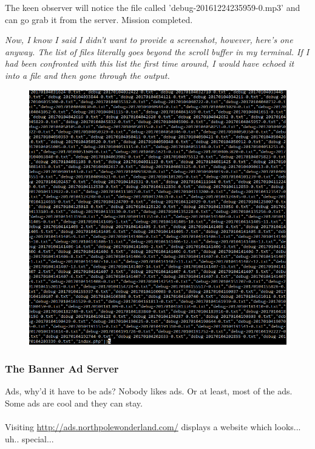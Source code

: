 \documentclass[writeup.tex]{subfiles}
\begin{document}
			The keen observer will notice the file called 'debug-20161224235959-0.mp3' and can go grab it from the server. Mission completed.
			
			\textit{Now, I know I said I didn't want to provide a screenshot, however, here's one anyway. The list of files literally goes beyond the scroll buffer in my terminal. If I had been confronted with this list the first time around, I would have echoed it into a file and then gone through the output.}
			
			\begin{figure}[H]
				\centering
				\includegraphics[width=\linewidth]{"screenshots/pwns/Site 3 - curl 2"}
			\end{figure}
			
		\subsubsection{The Banner Ad Server}
			Ads, why'd it have to be ads? Nobody likes ads. Or at least, most of the ads. Some ads are cool and they can stay.\\
			\\
			Visiting \url{http://ads.northpolewonderland.com/} displays a website which looks... uh.. special... 
			
\end{document}
